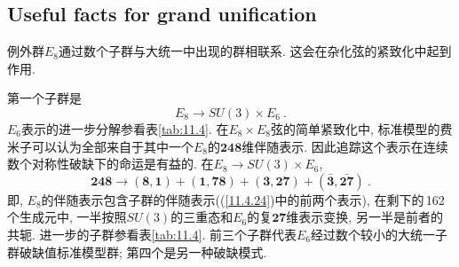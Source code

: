 \subsection*{Useful facts for grand unification}

例外群$ E_{8} $通过数个子群与大统一中出现的群相联系. 这会在杂化弦的紧致化中起到作用. 

第一个子群是
\begin{equation}
    E_{8} \to SU(3) \times E_{6} \:. \label{11.4.23}
\end{equation}
$E_{6} $表示的进一步分解参看表\ref{tab:11.4}. 在$ E_{8}\times E_{8} $弦的简单紧致化中, 标准模型的费米子可以认为全部来自于其中一个$ E_{8} $的$ \mathbf{248} $维伴随表示. 因此追踪这个表示在连续数个对称性破缺下的命运是有益的. 在$ E_{8}\to SU(3)\times E_{6}$,
\begin{equation}
    \mathbf{248} \to (\mathbf{8},\mathbf{1})+ (\mathbf{1},\mathbf{78})+ (\mathbf{3},\mathbf{27})
    +(\bar{\mathbf{3}},\bar{\mathbf{27}}) \:. \label{11.4.24}
\end{equation}
即, $E_{8} $的伴随表示包含子群的伴随表示((\ref{11.4.24})中的前两个表示), 在剩下的\,162\,个生成元中, 一半按照$ SU(3) $的三重态和$ E_{6} $的复$ \mathbf{27} $维表示变换, 另一半是前者的共轭. 进一步的子群参看表\ref{tab:11.4}. 前三个子群代表$ E_{6} $经过数个较小的大统一子群破缺值标准模型群; 第四个是另一种破缺模式.

